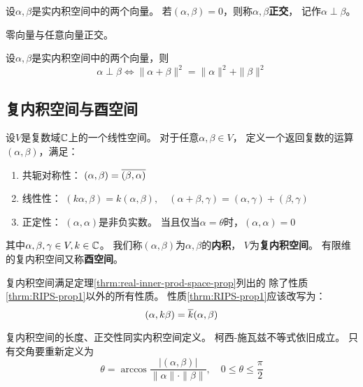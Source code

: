 \begin{definition}[正交]
  设$\alpha,\beta$是实内积空间中的两个向量。
  若$(\alpha,\beta)=0$，则称$\alpha,\beta$\textbf{正交}，
  记作$\alpha\perp\beta$。
\end{definition}

\begin{remark}
  零向量与任意向量正交。
\end{remark}

\begin{theorem}[正交的充要条件]
  设$\alpha,\beta$是实内积空间中的两个向量，则
  \begin{displaymath}
    \alpha\perp\beta \iff \|\alpha+\beta\|^2=\|\alpha\|^2+\|\beta\|^2
  \end{displaymath}
\end{theorem}

\subsection{复内积空间与酉空间}
\begin{definition}[复内积空间与酉空间]
  设$V$是复数域$\mathbb{C}$上的一个线性空间。
  对于任意$\alpha,\beta\in V$，
  定义一个返回复数的运算$(\alpha,\beta)$，满足：
  \begin{enumerate}
    \item 共轭对称性：
    $(\alpha,\beta)=\overline{(\beta,\alpha)}$
    \item 线性性：
    $(k\alpha,\beta)=k(\alpha,\beta),\quad
      (\alpha+\beta,\gamma)=(\alpha,\gamma)+(\beta,\gamma)$
    \item 正定性：
    $(\alpha,\alpha)$是非负实数。
    当且仅当$\alpha=\theta$时，$(\alpha,\alpha)=0$
  \end{enumerate}
  其中$\alpha,\beta,\gamma\in V, k\in\mathbb{C}$。
  我们称$(\alpha,\beta)$为$\alpha,\beta$的\textbf{内积}，
  $V$为\textbf{复内积空间}。
  有限维的复内积空间又称\textbf{酉空间}。
\end{definition}

\begin{theorem}[复内积空间的性质]
  复内积空间满足定理\ref{thrm:real-inner-prod-space-prop}列出的
  除了性质\ref{thrm:RIPS-prop1}以外的所有性质。
  性质\ref{thrm:RIPS-prop1}应该改写为：
  \[ (\alpha,k\beta)=\overline{k}(\alpha,\beta) \]
\end{theorem}

复内积空间的长度、正交性同实内积空间定义。
柯西-施瓦兹不等式依旧成立。
只有交角要重新定义为
\begin{displaymath}
  \theta = \arccos\frac{|(\alpha,\beta)|}{\|\alpha\|\cdot\|\beta\|},
  \quad 0\le\theta\le\frac{\pi}{2}
\end{displaymath}

